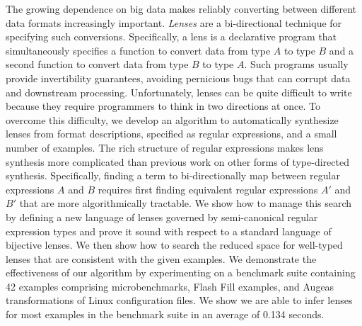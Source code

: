 The growing dependence on big data makes reliably converting
between different data formats increasingly important.
\emph{Lenses} are a bi-directional technique for specifying such
conversions.  Specifically, a lens is a declarative program that
simultaneously specifies a function to convert data from type $A$ to
type $B$ and a second function to convert data from type $B$ to type
$A$.  Such programs usually provide invertibility guarantees, avoiding
pernicious bugs that can corrupt data and downstream processing.
Unfortunately, lenses can be quite difficult to write because they
require programmers to think in two directions at once.  To overcome
this difficulty, we develop an algorithm to automatically synthesize
lenses from format descriptions, specified as regular expressions, and
a small number of examples.  The rich structure of regular expressions
makes lens synthesis more complicated than previous work on other
forms of type-directed synthesis.  Specifically, finding a term to
bi-directionally map between regular expressions $A$ and $B$ requires
first finding equivalent regular expressions $A'$ and $B'$ that are
more algorithmically tractable.
We show how to manage this search by defining a new language of
lenses governed by semi-canonical regular expression types and prove it
sound with respect to a standard language of bijective lenses.  
We then show
how to search the reduced space for well-typed lenses that are consistent
with the given examples.  We demonstrate the effectiveness of our algorithm
by experimenting on a benchmark suite containing 42 examples
comprising microbenchmarks, Flash Fill
examples, and Augeas transformations of Linux configuration files.
We show we are able to infer lenses for most examples in the
benchmark suite in an average of 0.134 seconds. 



